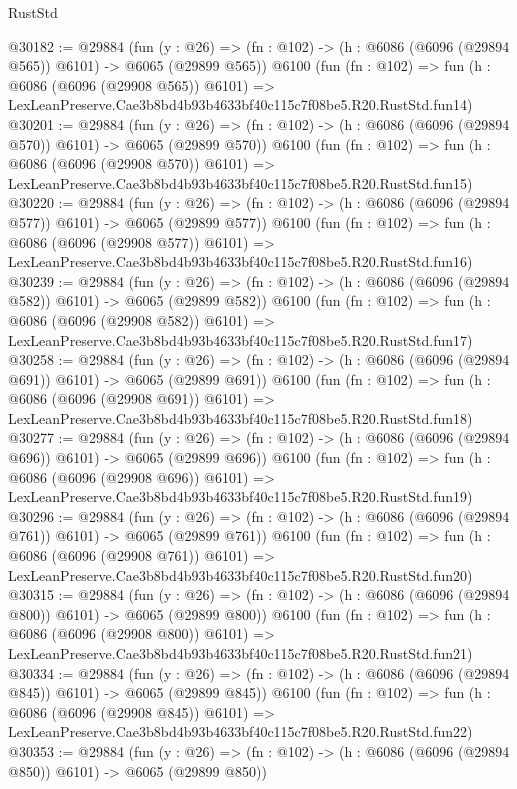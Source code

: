 \begin{lexlean}{RustStd}
\begin{coremodule}
@30182 := @29884
    (fun (y : @26) => (fn : @102) -> (h : @6086 (@6096 (@29894 @565)) @6101) -> @6065 (@29899 @565))
    @6100
    (fun (fn : @102) =>
    fun (h : @6086 (@6096 (@29908 @565)) @6101) =>
    LexLeanPreserve.Cae3b8bd4b93b4633bf40c115c7f08be5.R20.RustStd.fun14)
@30201 := @29884
    (fun (y : @26) => (fn : @102) -> (h : @6086 (@6096 (@29894 @570)) @6101) -> @6065 (@29899 @570))
    @6100
    (fun (fn : @102) =>
    fun (h : @6086 (@6096 (@29908 @570)) @6101) =>
    LexLeanPreserve.Cae3b8bd4b93b4633bf40c115c7f08be5.R20.RustStd.fun15)
@30220 := @29884
    (fun (y : @26) => (fn : @102) -> (h : @6086 (@6096 (@29894 @577)) @6101) -> @6065 (@29899 @577))
    @6100
    (fun (fn : @102) =>
    fun (h : @6086 (@6096 (@29908 @577)) @6101) =>
    LexLeanPreserve.Cae3b8bd4b93b4633bf40c115c7f08be5.R20.RustStd.fun16)
@30239 := @29884
    (fun (y : @26) => (fn : @102) -> (h : @6086 (@6096 (@29894 @582)) @6101) -> @6065 (@29899 @582))
    @6100
    (fun (fn : @102) =>
    fun (h : @6086 (@6096 (@29908 @582)) @6101) =>
    LexLeanPreserve.Cae3b8bd4b93b4633bf40c115c7f08be5.R20.RustStd.fun17)
@30258 := @29884
    (fun (y : @26) => (fn : @102) -> (h : @6086 (@6096 (@29894 @691)) @6101) -> @6065 (@29899 @691))
    @6100
    (fun (fn : @102) =>
    fun (h : @6086 (@6096 (@29908 @691)) @6101) =>
    LexLeanPreserve.Cae3b8bd4b93b4633bf40c115c7f08be5.R20.RustStd.fun18)
@30277 := @29884
    (fun (y : @26) => (fn : @102) -> (h : @6086 (@6096 (@29894 @696)) @6101) -> @6065 (@29899 @696))
    @6100
    (fun (fn : @102) =>
    fun (h : @6086 (@6096 (@29908 @696)) @6101) =>
    LexLeanPreserve.Cae3b8bd4b93b4633bf40c115c7f08be5.R20.RustStd.fun19)
@30296 := @29884
    (fun (y : @26) => (fn : @102) -> (h : @6086 (@6096 (@29894 @761)) @6101) -> @6065 (@29899 @761))
    @6100
    (fun (fn : @102) =>
    fun (h : @6086 (@6096 (@29908 @761)) @6101) =>
    LexLeanPreserve.Cae3b8bd4b93b4633bf40c115c7f08be5.R20.RustStd.fun20)
@30315 := @29884
    (fun (y : @26) => (fn : @102) -> (h : @6086 (@6096 (@29894 @800)) @6101) -> @6065 (@29899 @800))
    @6100
    (fun (fn : @102) =>
    fun (h : @6086 (@6096 (@29908 @800)) @6101) =>
    LexLeanPreserve.Cae3b8bd4b93b4633bf40c115c7f08be5.R20.RustStd.fun21)
@30334 := @29884
    (fun (y : @26) => (fn : @102) -> (h : @6086 (@6096 (@29894 @845)) @6101) -> @6065 (@29899 @845))
    @6100
    (fun (fn : @102) =>
    fun (h : @6086 (@6096 (@29908 @845)) @6101) =>
    LexLeanPreserve.Cae3b8bd4b93b4633bf40c115c7f08be5.R20.RustStd.fun22)
@30353 := @29884
    (fun (y : @26) => (fn : @102) -> (h : @6086 (@6096 (@29894 @850)) @6101) -> @6065 (@29899 @850))

\end{coremodule}
\end{lexlean}
